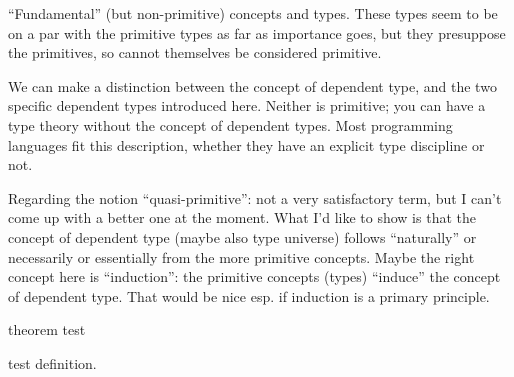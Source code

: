 \noindent ``Fundamental''%
(but non-primitive) concepts and types.  These types seem to be on a par
with the primitive types as far as importance goes, but they
presuppose the primitives, so cannot themselves be considered
primitive.

\begin{ednote}
  We can make a distinction between the concept of dependent type, and
  the two specific dependent types introduced here.  Neither is
  primitive; you can have a type theory without the concept of
  dependent types.  Most programming languages fit this description,
  whether they have an explicit type discipline or not.
\end{ednote}

\begin{ednote}
  Regarding the notion ``quasi-primitive'': not a very satisfactory
  term, but I can't come up with a better one at the moment.  What I'd
  like to show is that the concept of dependent type (maybe also type
  universe) follows ``naturally'' or necessarily or essentially from
  the more primitive concepts.  Maybe the right concept here is
  ``induction'': the primitive concepts (types) ``induce'' the concept
  of dependent type.  That would be nice esp. if induction is a
  primary principle.
\end{ednote}

\begin{theorem}
  theorem test
\end{theorem}

\begin{definition}
  test definition.
\end{definition}

